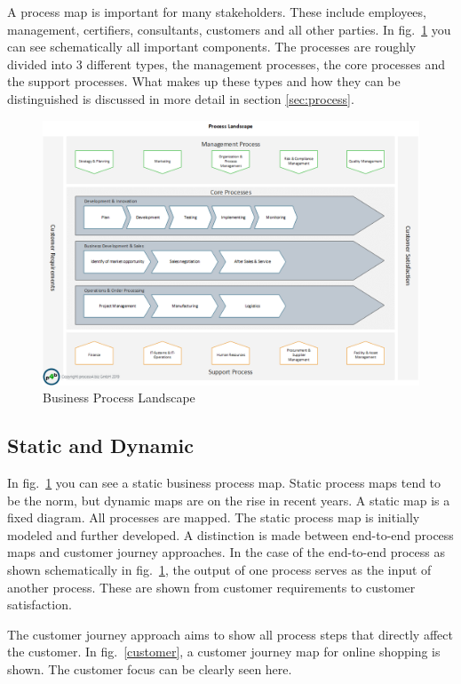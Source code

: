 \documentclass[11pt,a4paper]{article}
\begin{document}
A process map is important for many stakeholders. These include employees,
management, certifiers, consultants, customers and all other parties. In
fig.~\ref{BPL} you can see schematically all important components. The
processes are roughly divided into 3 different types, the management
processes, the core processes and the support processes. What makes up these
types and how they can be distinguished is discussed in more detail in section
\ref{sec:process}.

\begin{figure}[h] 
  \centering
     \includegraphics[width=\textwidth]{plk.en.png}
  \caption{Business Process Landscape \cite{7}}
  \label{BPL} 
\end{figure}

\subsection{Static and Dynamic}

In fig.~\ref{BPL} you can see a static business process map. Static process
maps tend to be the norm, but dynamic maps are on the rise in recent years. A
static map is a fixed diagram. All processes are mapped. The static process
map is initially modeled and further developed. A distinction is made between
end-to-end process maps and customer journey approaches. In the case of the
end-to-end process as shown schematically in fig.~\ref{BPL}, the output of one
process serves as the input of another process. These are shown from customer
requirements to customer satisfaction.

The customer journey approach aims to show all process steps that directly
affect the customer. In fig.~\ref{customer}, a customer journey map for online
shopping is shown. The customer focus can be clearly seen here.
\end{document}
